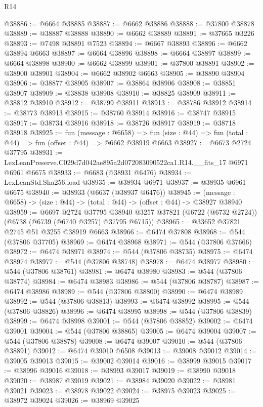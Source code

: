 \begin{lexlean}{R14}
\begin{coremodule}
@38886 := @6664 @38885
@38887 := @6662 @38886
@38888 := @37800 @38878
@38889 := @38887 @38888
@38890 := @6662 @38889
@38891 := @37665 @3226
@38893 := @7498 @38891 @7523
@38894 := @6667 @38893
@38896 := @6662 @38894 @6663
@38897 := @6664 @38896
@38898 := @6664 @38897
@38899 := @6664 @38898
@38900 := @6662 @38899
@38901 := @37800 @38891
@38902 := @38900 @38901
@38904 := @6662 @38902 @6663
@38905 := @38890 @38904
@38906 := @38877 @38905
@38907 := @38864 @38906
@38908 := @38851 @38907
@38909 := @38838 @38908
@38910 := @38825 @38909
@38911 := @38812 @38910
@38912 := @38799 @38911
@38913 := @38786 @38912
@38914 := @38773 @38913
@38915 := @38760 @38914
@38916 := @38747 @38915
@38917 := @38734 @38916
@38918 := @38726 @38917
@38919 := @38718 @38918
@38925 := fun (message : @6658) =>
  fun (size : @44) => fun (total : @44) => fun (offset : @44) => @6662 @38919 @6663
@38927 := @6673 @2724 @37795
@38931 := LexLeanPreserve.C029d7d042ae895a2d072083090522ca1.R14.__fits_17 @6971 @6961 @6675
@38933 := @6683 (@38931 @6476)
@38934 := LexLeanStd.Sha256.load
@38935 := @38934 @6971
@38937 := @38935 @6961 @6675
@38940 := @38933 (@6637 (@38937 @6476))
@38945 := (message : @6658) -> (size : @44) -> (total : @44) -> (offset : @44) -> @38927 @38940
@38959 := @6697
    @2724
    @37795
    @38940
    @3257
    @37821
    (@6722 (@6732 @2724))
    (@6738 (@6739 (@6740 @3257) @37795 @6715))
@38965 := @33652 @37821 @2745 @51 @3255 @38919 @6663
@38966 := @6474 @37808
@38968 := @544 (@37806 @37705)
@38969 := @6474 @38968
@38971 := @544 (@37806 @37666)
@38972 := @6474 @38971
@38974 := @544 (@37806 @38735)
@38975 := @6474 @38974
@38977 := @544 (@37806 @38748)
@38978 := @6474 @38977
@38980 := @544 (@37806 @38761)
@38981 := @6474 @38980
@38983 := @544 (@37806 @38774)
@38984 := @6474 @38983
@38986 := @544 (@37806 @38787)
@38987 := @6474 @38986
@38989 := @544 (@37806 @38800)
@38990 := @6474 @38989
@38992 := @544 (@37806 @38813)
@38993 := @6474 @38992
@38995 := @544 (@37806 @38826)
@38996 := @6474 @38995
@38998 := @544 (@37806 @38839)
@38999 := @6474 @38998
@39001 := @544 (@37806 @38852)
@39002 := @6474 @39001
@39004 := @544 (@37806 @38865)
@39005 := @6474 @39004
@39007 := @544 (@37806 @38878)
@39008 := @6474 @39007
@39010 := @544 (@37806 @38891)
@39012 := @6474 @39010 @6508
@39013 := @39008 @39012
@39014 := @39005 @39013
@39015 := @39002 @39014
@39016 := @38999 @39015
@39017 := @38996 @39016
@39018 := @38993 @39017
@39019 := @38990 @39018
@39020 := @38987 @39019
@39021 := @38984 @39020
@39022 := @38981 @39021
@39023 := @38978 @39022
@39024 := @38975 @39023
@39025 := @38972 @39024
@39026 := @38969 @39025

\end{coremodule}
\end{lexlean}
